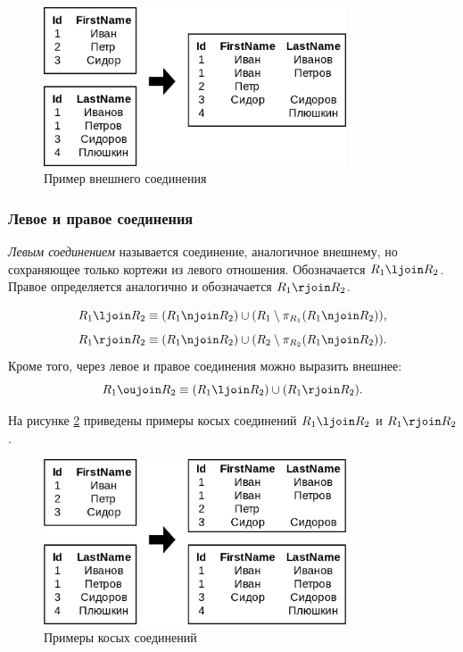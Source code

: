 \begin{figure}[H]
	\centering
	\includegraphics[width=0.8\textwidth]{../assets/kgeorgiy/relalgebra/Join_Outer_2.svg.png}
	\caption{Пример внешнего соединения}
	\label{outer-join-ex}
\end{figure}

\subsubsection{Левое и правое соединения}

\begin{definition}
	\textit{Левым соединением} называется соединение, аналогичное внешнему, но сохраняющее
	только кортежи из левого отношения. Обозначается $R_1 \ljoin R_2$. Правое определяется
	аналогично и обозначается $R_1 \rjoin R_2$.
\end{definition}

\begin{remark}
	\[
		R_1 \ljoin R_2 \equiv (R_1 \njoin R_2) \cup (R_1 \setminus \pi_{R_1}(R_1 \njoin R_2)),
	\]
	\[
		R_1 \rjoin R_2 \equiv (R_1 \njoin R_2) \cup (R_2 \setminus \pi_{R_2}(R_1 \njoin R_2)).
	\]
	Кроме того, через левое и правое соединения можно выразить внешнее: \[
		R_1 \oujoin R_2 \equiv (R_1 \ljoin R_2) \cup (R_1 \rjoin R_2).
	\]
\end{remark}

На рисунке \ref{lr-join-ex} приведены примеры косых соединений $R_1 \ljoin R_2$ и
$R_1 \rjoin R_2$.

\begin{figure}[H]
	\centering
	\includegraphics[width=0.8\textwidth]{../assets/kgeorgiy/relalgebra/Join_LeftRight_2.svg.png}
	\caption{Примеры косых соединений}
	\label{lr-join-ex}
\end{figure}

